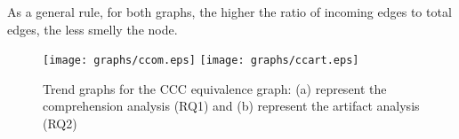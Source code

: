 As a general rule, for both graphs, the higher the ratio of incoming edges to total edges, the less smelly the node.


\begin{figure}[tb]
\centering
\texttt{[image: graphs/ccom.eps]}
\texttt{[image: graphs/ccart.eps]}
\vspace{-6pt}
\caption{Trend graphs for the CCC equivalence graph: (a) represent the comprehension analysis (RQ1) and (b) represent the artifact analysis (RQ2)}
\vspace{-6pt}
\vspace{-6pt}
\label{fig:graphsforanalysis}
\end{figure}







